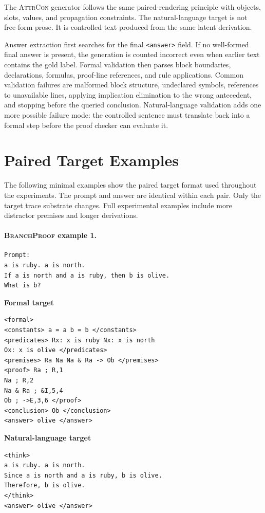 \documentclass[11pt]{article}
\newcommand{\branchproof}{\textsc{BranchProof}}
\newcommand{\attrcon}{\textsc{AttrCon}}
\begin{document}
The \attrcon{} generator follows the same paired-rendering principle with
objects, slots, values, and propagation constraints. The natural-language target
is not free-form prose. It is controlled text produced from the same latent
derivation.

Answer extraction first searches for the final \texttt{<answer>} field. If no
well-formed final answer is present, the generation is counted incorrect even
when earlier text contains the gold label. Formal validation then parses block
boundaries, declarations, formulas, proof-line references, and rule
applications. Common validation failures are malformed block structure,
undeclared symbols, references to unavailable lines, applying implication
elimination to the wrong antecedent, and stopping before the queried conclusion.
Natural-language validation adds one more possible failure mode: the controlled
sentence must translate back into a formal step before the proof checker can
evaluate it.

\section{Paired Target Examples}
\label{sec:paired-example}

The following minimal examples show the paired target format used throughout the
experiments. The prompt and answer are identical within each pair. Only the
target trace substrate changes. Full experimental examples include more
distractor premises and longer derivations.

\paragraph{\branchproof{} example 1.}

\begin{verbatim}
Prompt:
a is ruby. a is north.
If a is north and a is ruby, then b is olive.
What is b?
\end{verbatim}

\noindent\begin{minipage}[t]{0.48\linewidth}
\textbf{Formal target}
\scriptsize
\begin{verbatim}
<formal>
<constants> a = a b = b </constants>
<predicates> Rx: x is ruby Nx: x is north
Ox: x is olive </predicates>
<premises> Ra Na Na & Ra -> Ob </premises>
<proof> Ra ; R,1
Na ; R,2
Na & Ra ; &I,5,4
Ob ; ->E,3,6 </proof>
<conclusion> Ob </conclusion>
<answer> olive </answer>
\end{verbatim}
\end{minipage}\hfill
\begin{minipage}[t]{0.48\linewidth}
\textbf{Natural-language target}
\scriptsize
\begin{verbatim}
<think>
a is ruby. a is north.
Since a is north and a is ruby, b is olive.
Therefore, b is olive.
</think>
<answer> olive </answer>
\end{verbatim}
\end{minipage}
\end{document}
